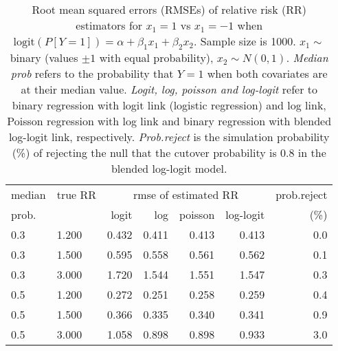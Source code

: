 \documentclass[12pt,a4paper]{article}
\begin{document}
\begin{table}[H] 
\small\sf\centering 
\caption{Root mean squared errors (RMSEs) of relative risk (RR) estimators for $x_1=1$ vs $x_1=-1$ when $\mbox{logit}(P[Y=1])=\alpha+\beta_1 x_1 + \beta_2 x_2$. Sample size is 1000. $x_1 \sim $binary (values $\pm 1$ with equal probability), $x_2 \sim N(0,1)$. {\it Median prob} refers to the probability that $Y=1$ when both covariates are at their median value. {\it Logit, log, poisson and log-logit} refer to binary regression with logit link (logistic regression) and log link, Poisson regression with log link and binary regression with blended log-logit link, respectively. {\it Prob.reject} is the simulation probability (\%) of rejecting the null that the cutover probability is $0.8$ in the blended log-logit model.} 
\begin{tabular}{llrrrrr} 
\toprule 
median & true RR & \multicolumn{4}{c}{rmse of estimated RR} & prob.reject \\ 
prob. & & logit & log & poisson & log-logit  & (\%) \\ \midrule 
0.3 & 1.200 & 0.432 & 0.411 & 0.413 & 0.413 & 0.0 \\  
0.3 & 1.500 & 0.595 & 0.558 & 0.561 & 0.562 & 0.1 \\  
0.3 & 3.000 & 1.720 & 1.544 & 1.551 & 1.547 & 0.3 \\  
0.5 & 1.200 & 0.272 & 0.251 & 0.258 & 0.259 & 0.4 \\  
0.5 & 1.500 & 0.366 & 0.335 & 0.340 & 0.341 & 0.9 \\  
0.5 & 3.000 & 1.058 & 0.898 & 0.898 & 0.933 & 3.0 \\  
\bottomrule 
\end{tabular} 
\end{table} 
\end{document}
